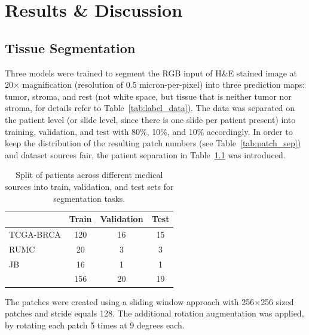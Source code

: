\chapter{Results \& Discussion}
\section{Tissue Segmentation}  \label{res_tissue_segm}
Three models were trained to segment the RGB input of H\&E stained image at 20$\times$ magnification
(resolution of 0.5 micron-per-pixel) into three prediction maps:
tumor, stroma, and rest (not white space, but tissue that is neither tumor nor stroma,
for details refer to Table~\ref*{tab:label_data}). The data was separated on the patient
level (or slide level, since there is one slide per patient present)
into training, validation, and test with 80\%, 10\%, and 10\% accordingly.
In order to keep the distribution of the resulting patch numbers (see Table~\ref*{tab:patch_sep})
and dataset sources fair, the patient separation in Table~\ref*{tab:patients_sep} was introduced.

\begin{table}[h!]
    \centering
    \begin{tabular}{ l c c c }
        \hline
        & Train & Validation & Test \\
        \hline
        TCGA-BRCA & 120 & 16 & 15 \\
        RUMC & 20 & 3 & 3 \\
        JB & 16 & 1 & 1 \\
        \hline
        & 156 & 20 & 19 \\
    \end{tabular}
\caption{\label{tab:patients_sep} Split of patients across different medical sources
into train, validation, and test sets for segmentation tasks.}
\end{table}

The patches were created using a sliding window approach with 256$\times$256 sized patches
and stride equals 128. The additional rotation augmentation was applied, by rotating each patch
5 times at 9 degrees each.

